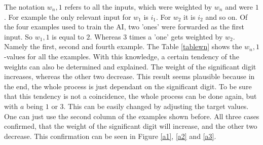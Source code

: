 \documentclass[12pt]{article}
\begin{document}
The notation $ w_n, 1 $ refers to all the inputs, which were weighted by $w_n$ and were $1$.
For example the only relevant input for $w_{1}$ is $i_{1}$. For $w_{2}$ it is $i_{2}$ and so on. Of the four examples used to train the AI, two 'ones' were forwarded as the first input. So $ w_1, 1 $ is equal to $2$. Whereas $3$ times a 'one' gets weighted by $w_2$. Namely the first, second and fourth example. The Table \ref{tablewn} shows the $w_n,1$-values for all the examples. With this knowledge, a certain tendency of the weights can also be determined and explained. The weight of the significant digit increases, whereas the other two decrease. This result seems plausible because in the end, the whole process is just dependant on the significant digit. To be sure that this tendency is not a coincidence, the whole process can be done again, but with $a$ being $1$ or $3$. This can be easily changed by adjusting the target values. One can just use the second column of the examples shown before.
All three cases confirmed, that the weight of the significant digit will increase, and the other two decrease. This confirmation can be seen in Figure \ref{a1}, \ref{a2} and \ref{a3}.
\end{document}
